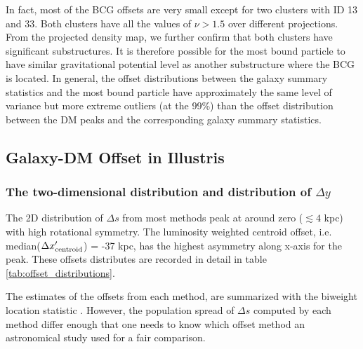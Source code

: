 In fact, most of the BCG offsets are very small except for two clusters with ID 13
and 33. Both clusters have all the values  of $\nu > 1.5 $ over different projections. 
From the projected density map, we further confirm that
both clusters have significant substructures. It is therefore possible for the
most bound particle to have similar gravitational potential level as another 
substructure where the BCG is located. 
In general, the offset distributions between the galaxy summary statistics and
the most bound particle have approximately the same level of variance but more
extreme outliers (at the 99\%) than the
offset distribution between the DM peaks and the corresponding galaxy summary
statistics.

\subsection{Galaxy-DM Offset in Illustris}
\subsubsection{The two-dimensional distribution and distribution of $\Delta y$}
The 2D distribution of $\Delta s$ from most methods peak at
around zero ($\lesssim 4$ kpc) with high rotational symmetry. 
The luminosity weighted centroid offset, i.e. median($\Delta x_{\rm
centroid}'$) = -37 kpc, has the highest asymmetry along x-axis for the peak.
These offsets distributes are recorded in detail in table
\ref{tab:offset_distributions}. 

The estimates of the offsets from each method, are summarized with the biweight 
location statistic \citep{Beers90}.
However, the population spread of $\Delta s$ computed by each method 
differ enough that one needs to know which offset method an astronomical study
used for a fair comparison. 

